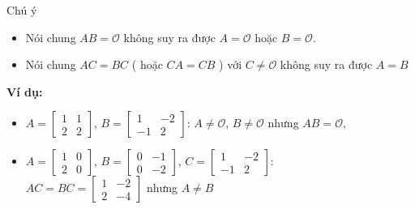 \documentclass[pdf,10pt]{beamer}
\begin{document}
\begin{frame}{Chú ý}
	\begin{itemize}
		\item Nói chung $AB = \mathcal{O}$ không suy ra được $A= \mathcal{O}$ hoặc $B= \mathcal{O}$.
		\item Nói chung $AC = BC$ ( hoặc $CA = CB$ ) với $C \neq \mathcal{O}$ không suy ra được $A = B$
	\end{itemize}
	\begin{flushleft}
		\textbf{Ví dụ:}
	\end{flushleft}
	\begin{itemize}
		\item 
		$A = \left[ 
		\begin{array}{rr}
			1 & 1 \\
			2 & 2 
		\end{array}
		\right]
		$, $B = 
		\left[
		\begin{array}{rr}
			1 & -2 \\
			-1 & 2 
		\end{array}
		\right]$:
		$A \neq \mathcal{O}$, $B \neq \mathcal{O}$ nhưng $AB = \mathcal{O}$,
		
		\item $
		A = \left[ 
		\begin{array}{rr}
			1 & 0 \\
			2 & 0 
		\end{array}
		\right]$, 
		$B = 
		\left[
		\begin{array}{rr}
			0 & -1 \\
			0 & -2 
		\end{array}
		\right]$,
		$C = \left[
		\begin{array}{rr}
			1 & -2 \\
			-1 & 2 
		\end{array}
		\right]$: \\[3mm] $AC = BC = 
		\left[
		\begin{array}{cc}
			1 & -2  \\
			2 & -4 
		\end{array}
		\right]$ nhưng $A \neq B$
		
	\end{itemize}
	
\end{frame}
\end{document}
